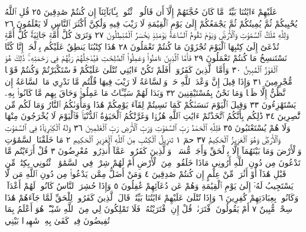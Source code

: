 عَلَيْهِمْ ءَايَٰتُنَا بَيِّنَٰتࣲ مَّا كَانَ حُجَّتَهُمْ إِلَّآ أَن قَالُوا۟ ٱئْتُوا۟ بِـَٔابَآئِنَآ إِن
كُنتُمْ صَٰدِقِينَ ٢٥ قُلِ ٱللَّهُ يُحْيِيكُمْ ثُمَّ يُمِيتُكُمْ ثُمَّ يَجْمَعُكُمْ إِلَىٰ
يَوْمِ ٱلْقِيَٰمَةِ لَا رَيْبَ فِيهِ وَلَٰكِنَّ أَكْثَرَ ٱلنَّاسِ لَا يَعْلَمُونَ ٢٦ وَلِلَّهِ مُلْكُ
ٱلسَّمَٰوَٰتِ وَٱلْأَرْضِۚ وَيَوْمَ تَقُومُ ٱلسَّاعَةُ يَوْمَئِذࣲ يَخْسَرُ ٱلْمُبْطِلُونَ ٢٧
وَتَرَىٰ كُلَّ أُمَّةࣲ جَاثِيَةࣰۚ كُلُّ أُمَّةࣲ تُدْعَىٰٓ إِلَىٰ كِتَٰبِهَا ٱلْيَوْمَ تُجْزَوْنَ مَا كُنتُمْ
تَعْمَلُونَ ٢٨ هَٰذَا كِتَٰبُنَا يَنطِقُ عَلَيْكُم بِٱلْحَقِّۚ إِنَّا كُنَّا نَسْتَنسِخُ
مَا كُنتُمْ تَعْمَلُونَ ٢٩ فَأَمَّا ٱلَّذِينَ ءَامَنُوا۟ وَعَمِلُوا۟ ٱلصَّٰلِحَٰتِ
فَيُدْخِلُهُمْ رَبُّهُمْ فِي رَحْمَتِهِۦۚ ذَٰلِكَ هُوَ ٱلْفَوْزُ ٱلْمُبِينُ ٣٠ وَأَمَّا
ٱلَّذِينَ كَفَرُوٓا۟ أَفَلَمْ تَكُنْ ءَايَٰتِي تُتْلَىٰ عَلَيْكُمْ فَٱسْتَكْبَرْتُمْ وَكُنتُمْ قَوْمࣰا
مُّجْرِمِينَ ٣١ وَإِذَا قِيلَ إِنَّ وَعْدَ ٱللَّهِ حَقࣱّ وَٱلسَّاعَةُ لَا رَيْبَ فِيهَا
قُلْتُم مَّا نَدْرِي مَا ٱلسَّاعَةُ إِن نَّظُنُّ إِلَّا ظَنࣰّا وَمَا نَحْنُ بِمُسْتَيْقِنِينَ ٣٢
وَبَدَا لَهُمْ سَيِّـَٔاتُ مَا عَمِلُوا۟ وَحَاقَ بِهِم مَّا كَانُوا۟ بِهِۦ يَسْتَهْزِءُونَ ٣٣
وَقِيلَ ٱلْيَوْمَ نَنسَىٰكُمْ كَمَا نَسِيتُمْ لِقَآءَ يَوْمِكُمْ هَٰذَا وَمَأْوَىٰكُمُ ٱلنَّارُ
وَمَا لَكُم مِّن نَّٰصِرِينَ ٣٤ ذَٰلِكُم بِأَنَّكُمُ ٱتَّخَذْتُمْ ءَايَٰتِ ٱللَّهِ هُزُوࣰا
وَغَرَّتْكُمُ ٱلْحَيَوٰةُ ٱلدُّنْيَاۚ فَٱلْيَوْمَ لَا يُخْرَجُونَ مِنْهَا وَلَا هُمْ يُسْتَعْتَبُونَ ٣٥
فَلِلَّهِ ٱلْحَمْدُ رَبِّ ٱلسَّمَٰوَٰتِ وَرَبِّ ٱلْأَرْضِ رَبِّ ٱلْعَٰلَمِينَ ٣٦
وَلَهُ ٱلْكِبْرِيَآءُ فِي ٱلسَّمَٰوَٰتِ وَٱلْأَرْضِۖ وَهُوَ ٱلْعَزِيزُ ٱلْحَكِيمُ ٣٧
حمٓ ١ تَنزِيلُ ٱلْكِتَٰبِ مِنَ ٱللَّهِ ٱلْعَزِيزِ ٱلْحَكِيمِ ٢ مَا خَلَقْنَا
ٱلسَّمَٰوَٰتِ وَٱلْأَرْضَ وَمَا بَيْنَهُمَآ إِلَّا بِٱلْحَقِّ وَأَجَلࣲ مُّسَمࣰّىۚ وَٱلَّذِينَ
كَفَرُوا۟ عَمَّآ أُنذِرُوا۟ مُعْرِضُونَ ٣ قُلْ أَرَءَيْتُم مَّا تَدْعُونَ مِن
دُونِ ٱللَّهِ أَرُونِي مَاذَا خَلَقُوا۟ مِنَ ٱلْأَرْضِ أَمْ لَهُمْ شِرْكࣱ فِي
ٱلسَّمَٰوَٰتِۖ ٱئْتُونِي بِكِتَٰبࣲ مِّن قَبْلِ هَٰذَآ أَوْ أَثَٰرَةࣲ مِّنْ عِلْمٍ إِن كُنتُمْ
صَٰدِقِينَ ٤ وَمَنْ أَضَلُّ مِمَّن يَدْعُوا۟ مِن دُونِ ٱللَّهِ مَن
لَّا يَسْتَجِيبُ لَهُۥٓ إِلَىٰ يَوْمِ ٱلْقِيَٰمَةِ وَهُمْ عَن دُعَآئِهِمْ غَٰفِلُونَ ٥
وَإِذَا حُشِرَ ٱلنَّاسُ كَانُوا۟ لَهُمْ أَعْدَآءࣰ وَكَانُوا۟ بِعِبَادَتِهِمْ كَٰفِرِينَ ٦ وَإِذَا
تُتْلَىٰ عَلَيْهِمْ ءَايَٰتُنَا بَيِّنَٰتࣲ قَالَ ٱلَّذِينَ كَفَرُوا۟ لِلْحَقِّ لَمَّا جَآءَهُمْ هَٰذَا
سِحْرࣱ مُّبِينٌ ٧ أَمْ يَقُولُونَ ٱفْتَرَىٰهُۖ قُلْ إِنِ ٱفْتَرَيْتُهُۥ فَلَا تَمْلِكُونَ
لِي مِنَ ٱللَّهِ شَيْـًٔاۖ هُوَ أَعْلَمُ بِمَا تُفِيضُونَ فِيهِۚ كَفَىٰ بِهِۦ شَهِيدَۢا بَيْنِي

